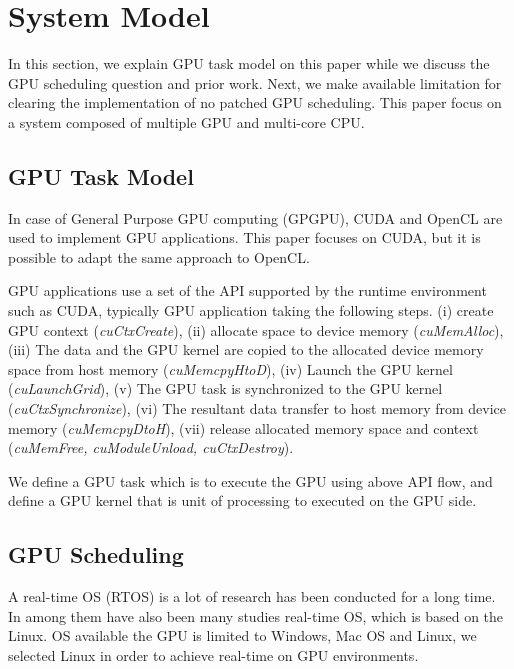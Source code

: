 \section{System Model}\label{sec:system_model}
In this section, we explain GPU task model on this paper while we discuss the GPU scheduling question and prior work.
Next, we make available limitation for clearing the implementation of no patched GPU scheduling.
This paper focus on a system composed of multiple GPU and multi-core CPU.

\subsection{GPU Task Model}
In case of  General Purpose GPU computing (GPGPU), CUDA and OpenCL are used to implement GPU applications.
This paper focuses on CUDA, but it is possible to adapt the same approach to OpenCL.

GPU applications use a set of the API supported by the runtime environment such as CUDA,
typically GPU application taking the following steps.
(i) create GPU context (\textit{cuCtxCreate}), 
(ii) allocate space to device memory (\textit{cuMemAlloc}), 
(iii) The data and the GPU kernel are copied to the allocated device memory space from host memory (\textit{cuMemcpyHtoD}), 
(iv) Launch the GPU kernel (\textit{cuLaunchGrid}), 
(v) The GPU task is synchronized to the GPU kernel (\textit{cuCtxSynchronize}), 
(vi) The resultant data transfer to host memory from device memory (\textit{cuMemcpyDtoH}), 
(vii) release allocated memory space and context (\textit{cuMemFree, cuModuleUnload, cuCtxDestroy}).

We define a GPU task which is to execute the GPU using above API flow,
and define a GPU kernel that is unit of processing to executed on the GPU side.


\subsection{GPU Scheduling}
A real-time OS (RTOS) is a lot of research\cite{spring, redline,itron,rk} has been conducted for a long time.
In among them have also been many studies\cite{prk,rtai,yodaiken1999rtlinux,litmus,kato2009loadable} real-time OS, which is based on the Linux.
OS available the GPU is limited to Windows, Mac OS and Linux,
we selected Linux in order to achieve real-time on GPU environments.

